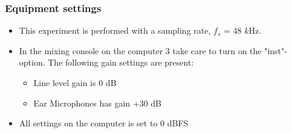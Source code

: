 \subsubsection{Equipment settings}
\begin{itemize}
	\item This experiment is performed with a sampling rate, $f_{s}$ = 48 $k$Hz. 
	\item In the mixing console on the computer 3 take care to turn on the "inst"-option. The following gain settings are present: 		
	\begin{itemize}
		\item Line level gain is 0 dB
		\item Ear Microphones has gain +30 dB
	\end{itemize}
	\item All settings on the computer is set to 0 dBFS
\end{itemize}
	
	
